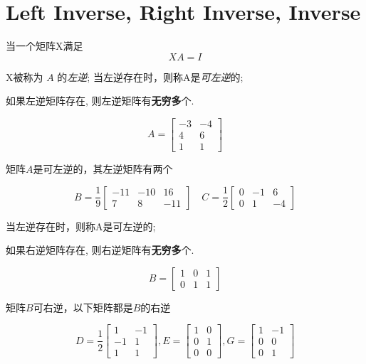 \section{Left Inverse, Right Inverse, Inverse}

\begin{definition}[$A$的左逆]
    当一个矩阵X满足 $$ X A=I $$ 
    
    X被称为 $ A $ 的\textit{左逆}; 当左逆存在时，则称A是\textit{可左逆}的;
\end{definition}

    如果左逆矩阵存在, 则左逆矩阵有\textbf{无穷多}个.

\begin{example}
    $$ A=\left[\begin{array}{cc}-3 & -4 \\ 4 & 6 \\ 1 & 1\end{array}\right] $$

    矩阵$A$是可左逆的，其左逆矩阵有两个

    $$ B=\frac{1}{9}\left[\begin{array}{ccc}-11 & -10 & 16 \\ 7 & 8 & -11\end{array}\right] \quad C=\frac{1}{2}\left[\begin{array}{ccc}0 & -1 & 6 \\ 0 & 1 & -4\end{array}\right] $$
\end{example}

\begin{definition}[$A$的右逆]
    当左逆存在时，则称A是可左逆的;
\end{definition}

    如果右逆矩阵存在, 则右逆矩阵有\textbf{无穷多}个.


\begin{example}
    $$ B=\left[\begin{array}{lll}1 & 0 & 1 \\ 0 & 1 & 1\end{array}\right] $$

    矩阵$B$可右逆，以下矩阵都是$B$的右逆

    $$ D=\frac{1}{2}\left[\begin{array}{cc}1 & -1 \\ -1 & 1 \\ 1 & 1\end{array}\right], E=\left[\begin{array}{ll}1 & 0 \\ 0 & 1 \\ 0 & 0\end{array}\right], G=\left[\begin{array}{cc}1 & -1 \\ 0 & 0 \\ 0 & 1\end{array}\right] $$
\end{example}


